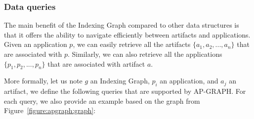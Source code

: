 \subsubsection{Data queries}
The main benefit of the Indexing Graph compared to other data structures is that it offers the ability to navigate efficiently between artifacts and applications.
Given an application $\mathit{p}$, we can easily retrieve all the artifacts $\{\mathit{a}_1, \mathit{a}_2, ..., \mathit{a}_n\}$ that are associated with $\mathit{p}$.
Similarly, we can also retrieve all the applications $\{\mathit{p}_1, \mathit{p}_2, ..., \mathit{p}_n\}$ that are associated with artifact $\mathit{a}$.

More formally, let us note  $g$ an Indexing Graph, $p_i$ an application, and $a_j$ an artifact,   we define the following queries that are supported by AP-GRAPH.
For each query, we also provide an example based on the graph from Figure~\ref{figure:apgraph:graph}:

